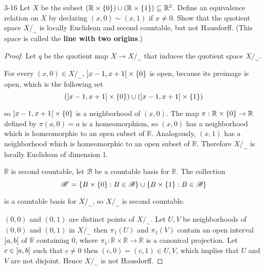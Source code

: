 \begin{problem}{3-16}
Let $X$ be the subset $(\mathbb{R}\times\left\{{0}\right\}) \cup (\mathbb{R}\times\left\{{1}\right\}) \subseteq \mathbb{R}^{2}$. Define an equivalence relation on $X$ by declaring $(x, 0) \sim (x, 1)$ if $x\ne 0$. Show that the quotient space $X/_{\sim}$ is locally Euclidean and second countable, but not Hausdorff. (This space is called the \textbf{line with two origins}.)
\end{problem}

\begin{proof}
    Let $q$ be the quotient map $X\to X/_{\sim}$ that induces the quotient space $X/_{\sim}$.

    For every $(x, 0) \in X/_{\sim}$, $\left]{x - 1, x + 1}\right[ \times \left\{{0}\right\}$ is open, because its preimage is open, which is the following set
    \begin{equation*}
        (\left]{x - 1, x + 1}\right[ \times \left\{{0}\right\}) \cup (\left]{x - 1, x + 1}\right[ \times \left\{{1}\right\})
    \end{equation*}

    so $\left]{x - 1, x + 1}\right[ \times \left\{{0}\right\}$ is a neighborhood of $(x, 0)$. The map $\pi: \mathbb{R} \times \left\{{0}\right\} \to \mathbb{R}$ defined by $\pi(a, 0) = a$ is a homeomorphism, so $(x, 0)$ has a neighborhood which is homeomorphic to an open subset of $\mathbb{R}$. Analogously, $(x, 1)$ has a neighborhood which is homeomorphic to an open subset of $\mathbb{R}$. Therefore $X/_{\sim}$ is locally Euclidean of dimension 1.

    $\mathbb{R}$ is second countable, let $\mathscr{B}$ be a countable basis for $\mathbb{R}$. The collection
    \begin{equation*}
        \mathscr{B'} = \left\{{B \times\left\{{0}\right\} : B\in\mathscr{B}}\right\} \cup \left\{{B \times\left\{{1}\right\} : B\in\mathscr{B}}\right\}
    \end{equation*}

    is a countable basis for $X/_{\sim}$, so $X/_{\sim}$ is second countable.

    $(0, 0)$ and $(0, 1)$ are distinct points of $X/_{\sim}$. Let $U, V$ be neighborhoods of $(0, 0)$ and $(0, 1)$ in $X/_{\sim}$ then $\pi_{1}(U)$ and $\pi_{1}(V)$ contain an open interval $\left]{a, b}\right[$ of $\mathbb{R}$ containing $0$, where $\pi_{1}: \mathbb{R}\times\mathbb{R} \to \mathbb{R}$ is a canonical projection. Let $c\in \left]{a, b}\right[$ such that $c\ne 0$ then $(c, 0) = (c, 1) \in U, V$, which implies that $U$ and $V$ are not disjoint. Hence $X/_{\sim}$ is not Hausdorff.
\end{proof}

